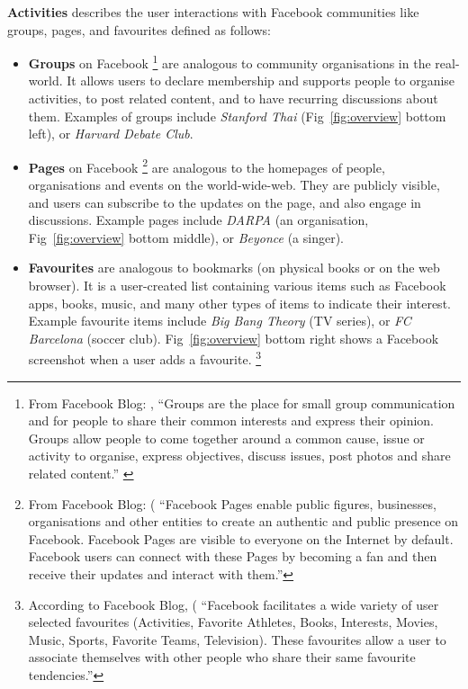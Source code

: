 {\bf Activities} describes the user interactions with Facebook
communities like groups, pages, and favourites defined as follows:
\begin{itemize}
  \item \textbf{Groups} on Facebook 
\footnote{From Facebook Blog: 
, ``Groups are the place for small group communication and for people to share their common interests and express their opinion. Groups allow people to come together around a common cause, issue or activity to organise, express objectives, discuss issues, post photos and share related content.'' 
\label{fn:fbblog}}
are analogous to community organisations in the real-world. It allows
  users to declare membership and supports people to organise
  activities, to post related content, and to have recurring
  discussions about them.  Examples of groups include {\em Stanford
  Thai} (Fig~\ref{fig:overview} bottom left), or {\em Harvard Debate
  Club}.  \item \textbf{Pages} on Facebook \footnote{From Facebook
  Blog:
  (
  ``Facebook Pages enable public figures, businesses, organisations
  and other entities to create an authentic and public presence on
  Facebook. Facebook Pages are visible to everyone on the Internet by
  default. Facebook users can connect with these Pages by becoming a
  fan and then receive their updates and interact with them.'' }
  are analogous to the homepages of people, organisations and events
  on the world-wide-web. They are publicly visible, and users can
  subscribe to the updates on the page, and also engage in
  discussions. Example pages include {\em DARPA} (an organisation,
  Fig~\ref{fig:overview} bottom middle), or {\em Beyonce} (a singer).

  \item \textbf{Favourites} are analogous to bookmarks (on physical
  books or on the web browser). It is a user-created list containing
  various items such as Facebook apps, books, music, and many other
  types of items to indicate their interest. Example favourite items
  include {\em Big Bang Theory} (TV series), or {\em FC Barcelona}
  (soccer club). Fig~\ref{fig:overview} bottom right shows a Facebook
  screenshot when a user adds a favourite.  \footnote{According to
  Facebook Blog, (
  ``Facebook facilitates a wide variety of user selected favourites
  (Activities, Favorite Athletes, Books, Interests, Movies, Music,
  Sports, Favorite Teams, Television). These favourites allow a user
  to associate themselves with other people who share their same
  favourite tendencies.''}
\end{itemize} 

